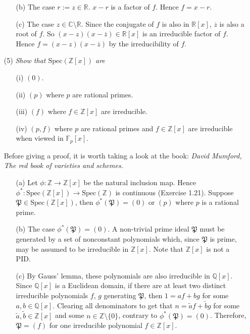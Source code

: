 \documentclass{article}
\begin{document}
\begin{enumerate}
\begin{enumerate}
  \item[(b)]
    The case $r := z \in \mathbb{R}$.
    $x - r$ is a factor of $f$.
    Hence $f = x - r$.

  \item[(c)]
    The case $z \in \mathbb{C} \setminus \mathbb{R}$.
    Since the conjugate of $f$ is also in $\mathbb{R}[x]$, $\overline{z}$ is also a root of $f$.
    So $(x - z)(x - \overline{z}) \in \mathbb{R}[x]$ is an irreducible factor of $f$.
    Hence $f = (x - z)(x - \overline{z})$ by the irreducibility of $f$.
  \end{enumerate}

\item[(5)]
  \emph{Show that $\mathrm{Spec}(\mathbb{Z}[x])$ are}
  \begin{enumerate}
  \item[(i)]
    $(0)$.
  \item[(ii)]
    $(p)$ where $p$ are rational primes.
  \item[(iii)]
    $(f)$ where $f \in \mathbb{Z}[x]$ are irreducible.
  \item[(iv)]
    $(p,f)$ where $p$ are rational primes and
    $f \in \mathbb{Z}[x]$ are irreducible when viewed in $\mathbb{F}_p[x]$.
  \end{enumerate}
  Before giving a proof, it is worth taking a look at the book:
  \emph{David Mumford, The red book of varieties and schemes}.

  \begin{enumerate}
  \item[(a)]
    Let $\phi: \mathbb{Z} \to \mathbb{Z}[x]$ be the natural inclusion map.
    Hence $\phi^{*}: \mathrm{Spec}(\mathbb{Z}[x]) \to \mathrm{Spec}(\mathbb{Z})$ is continuous
    (Exercise 1.21).
    Suppose $\mathfrak{P} \in \mathrm{Spec}(\mathbb{Z}[x])$,
    then $\phi^{*}(\mathfrak{P}) = (0)$ or $(p)$ where $p$ is a rational prime.

  \item[(b)]
    The case $\phi^{*}(\mathfrak{P}) = (0)$.
    A non-trivial prime ideal $\mathfrak{P}$ must be generated by a set of nonconstant polynomials which,
    since $\mathfrak{P}$ is prime,
    may be assumed to be irreducible in $\mathbb{Z}[x]$.
    Note that $\mathbb{Z}[x]$ is not a PID.

  \item[(c)]
    By Gauss' lemma, these polynomials are also irreducible in $\mathbb{Q}[x]$.
    Since $\mathbb{Q}[x]$ is a Euclidean domain,
    if there are at least two distinct irreducible polynomials $f$, $g$ generating $\mathfrak{P}$,
    then $1 = af + bg$ for some $a, b \in \mathbb{Q}[x]$.
    Clearing all denominators to get that
    $n = \widetilde{a}f + \widetilde{b}g$ for some $\widetilde{a}, \widetilde{b} \in \mathbb{Z}[x]$ and
    some $n \in \mathbb{Z} \setminus \{0\}$, contrary to $\phi^{*}(\mathfrak{P}) = (0)$.
    Therefore, $\mathfrak{P} = (f)$ for one irreducible polynomial $f \in \mathbb{Z}[x]$.


\end{enumerate}
\end{enumerate}
\end{document}
